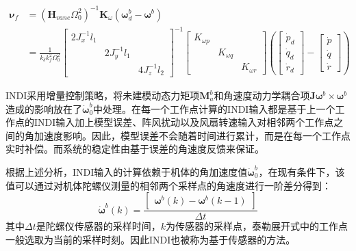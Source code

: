 \begin{equation}
    \begin{aligned}
        \boldsymbol{\nu}_f&=(\boldsymbol{H}_{vane}\Omega_0^2)^{-1}\boldsymbol{K}_{\omega}(\boldsymbol{\omega}_d^b-\boldsymbol{\omega}^b)\\
        &=\frac{1}{k_{\delta}k_f^2\Omega_0^2}
        \left[\begin{array}{ccc}2J_x^{-1}l_1 & & \\& 2J_y^{-1}l_1 & \\& & 4J_z^{-1}l_2\end{array}\right]^{-1}
        \left[\begin{array}{ccc}{K}_{\omega p} & & \\& {K}_{\omega q} & \\& & {K}_{\omega r}\end{array}\right]
        \left (\begin{bmatrix}\dot{p}_d \\ \dot{q}_d \\ \dot{r}_d \end{bmatrix}-\begin{bmatrix}\dot{p} \\ \dot{q} \\ \dot{r}
        \end{bmatrix}\right )
    \end{aligned}
    \label{3-48}
\end{equation}

INDI采用增量控制策略，将未建模动态力矩项$\boldsymbol{M}_{a}^b$和角速度动力学耦合项$\boldsymbol{J}\boldsymbol{\omega}^b\times\boldsymbol{\omega}^b$造成的影响放在了$\dot {\boldsymbol{\omega}}_0^b$中处理。在每一个工作点计算的INDI输入都是基于上一个工作点的INDI输入加上模型误差、阵风扰动以及风扇转速输入对相邻两个工作点之间的角加速度影响。因此，模型误差不会随着时间进行累计，而是在每一个工作点实时补偿。而系统的稳定性由基于误差的角速度反馈来保证。

根据上述分析，INDI输入的计算依赖于机体的角加速度值$\dot {\boldsymbol{\omega}}_0^b$，在现有条件下，该值可以通过对机体陀螺仪测量的相邻两个采样点的角速度进行一阶差分得到：
\begin{equation}
    \dot{\boldsymbol{\omega}}^b(k)=\frac{
        \begin{bmatrix}
        \boldsymbol{\omega}^b(k)-\boldsymbol{\omega}^b(k-1)
        \end{bmatrix}}{\Delta t}
    \label{3-49}
\end{equation}
其中$\Delta t$是陀螺仪传感器的采样时间，$k$为传感器的采样点，泰勒展开式中的工作点一般选取为当前的采样时刻。因此INDI也被称为基于传感器的方法。

